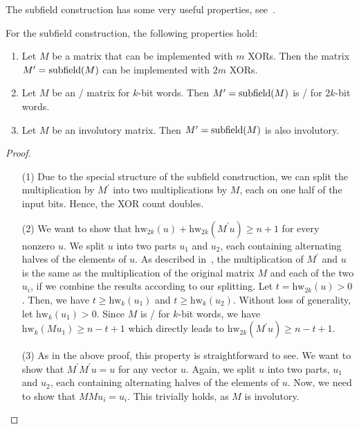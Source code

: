 The subfield construction has some very useful properties, see~.
\begin{lemma}\label{slps:lem:subfield}
    For the subfield construction, the following properties hold:
    \begin{enumerate}
        \item Let $M$ be a matrix that can be implemented with $m$ XORs.
            Then the matrix $M^\prime = \operatorname{subfield}(M)$ can be implemented with $2m$ XORs.
        \item Let $M$ be an \MDS/ matrix for $k$-bit words.
            Then $M^\prime = \operatorname{subfield}(M)$ is \MDS/ for $2k$-bit words.
        \item Let $M$ be an involutory matrix.
            Then $M^\prime = \operatorname{subfield}(M)$ is also involutory.
    \end{enumerate}
\end{lemma}
\begin{proof}
\begin{itemize}
\item[] \hphantom{.}
\item[(1)] Due to the special structure of the subfield construction, we can split the multiplication by $M^\prime$ into two multiplications by $M$, each on one half of the input bits.
           Hence, the XOR count doubles.
\item[(2)] We want to show that $\mathrm{hw}_{2k}(u) + \mathrm{hw}_{2k}(M^\prime u) \geq n+1$ for every nonzero $u$.
           We split $u$ into two parts $u_1$ and $u_2$, each containing alternating halves of the elements of $u$.
           As described in~\cite{CHES:KPPY14}, the multiplication of $M^\prime$ and $u$ is the same as the multiplication of the original matrix $M$ and each of the two $u_i$, if we combine the results according to our splitting.
           Let $t = \mathrm{hw}_{2k}(u) > 0$.
           Then, we have $t \geq \mathrm{hw}_k(u_1)$ and $t \geq \mathrm{hw}_k(u_2)$.
           Without loss of generality, let $\mathrm{hw}_k(u_1) > 0$.
           Since $M$ is \MDS/ for $k$-bit words, we have $\mathrm{hw}_k(M u_1) \geq n-t+1$ which directly leads to $\mathrm{hw}_{2k}(M^\prime u) \geq n-t+1$.
\item[(3)] As in the above proof, this property is straightforward to see.
           We want to show that $M^\prime M^\prime u = u$ for any vector $u$.
           Again, we split $u$ into two parts, $u_1$ and $u_2$, each containing alternating halves of the elements of $u$.
           Now, we need to show that $M M u_i = u_i$.
           This trivially holds, as $M$ is involutory.
\end{itemize}
\end{proof}


